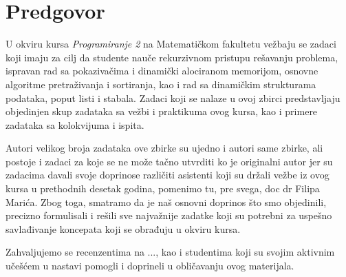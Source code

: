 
\chapter*{Predgovor}

U okviru kursa {\em Programiranje 2} na Matematičkom fakultetu vežbaju se zadaci koji imaju za cilj da studente nauče rekurzivnom pristupu rešavanju problema, ispravan rad sa pokazivačima i dinamički alociranom memorijom,  osnovne algoritme pretraživanja i sortiranja, kao i rad sa dinamičkim strukturama podataka, poput listi i stabala.  Zadaci koji se nalaze u ovoj zbirci predstavljaju objedinjen skup zadataka sa vežbi i praktikuma ovog kursa, kao i primere zadataka sa kolokvijuma i ispita. 

Autori velikog broja zadataka ove zbirke su ujedno i autori same zbirke, ali postoje i zadaci za koje se ne može tačno utvrditi ko je originalni autor jer su zadacima davali svoje doprinose različiti asistenti koji su držali vežbe iz ovog kursa u prethodnih desetak godina, pomenimo tu, pre svega, doc dr Filipa Marića. Zbog toga, smatramo da je naš osnovni doprinos što smo objedinili, precizno formulisali i rešili sve najvažnije zadatke koji su potrebni za uspešno savlađivanje koncepata koji se obrađuju u okviru kursa. 

Zahvaljujemo se recenzentima na ..., kao i studentima koji su svojim aktivnim učešćem u nastavi pomogli i doprineli u obličavanju ovog materijala. 






